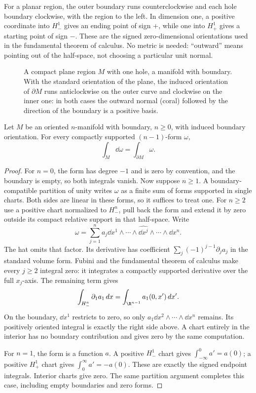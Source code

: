 For a planar region, the outer boundary runs counterclockwise and each hole boundary clockwise, with the region to the left. In dimension one, a positive coordinate into $H_-^1$ gives an ending point of sign $+$, while one into $H_+^1$ gives a starting point of sign $-$. These are the signed zero-dimensional orientations used in the fundamental theorem of calculus. No metric is needed: ``outward'' means pointing out of the half-space, not choosing a particular unit normal.

\begin{figure}[ht]
\centering
{}
\caption{A compact plane region $M$ with one hole, a manifold with boundary. With the standard orientation of the plane, the induced orientation of
$\partial M$ runs anticlockwise on the outer curve and clockwise on the inner one: in both cases the outward normal (coral) followed by the direction of the
boundary is a positive basis.}
\label{fig:boundary}
\end{figure}

\begin{theorem}[Stokes]\label{thm:stokes}
Let $M$ be an oriented $n$-manifold with boundary, $n\ge0$, with induced boundary orientation. For every compactly supported $(n-1)$-form $\omega$,
\[
\int_M\dd\omega=\int_{\partial M}\omega.
\]
\end{theorem}

\begin{proof}
For $n=0$, the form has degree $-1$ and is zero by convention, and the boundary is empty, so both integrals vanish. Now suppose $n\ge1$. A boundary-compatible partition of unity writes $\omega$ as a finite sum of forms supported in single charts. Both sides are linear in these forms, so it suffices to treat one. For $n\ge2$ use a positive chart normalized to $H_-^n$, pull back the form and extend it by zero outside its compact relative support in that half-space. Write
\[
\omega=\sum_{j=1}^n a_j\dd x^1\wedge\cdots\wedge\widehat{\dd x^j}\wedge\cdots\wedge\dd x^n.
\]
The hat omits that factor. Its derivative has coefficient $\sum_j(-1)^{j-1}\partial_ja_j$ in the standard volume form. Fubini and the fundamental theorem of calculus make every $j\ge2$ integral zero: it integrates a compactly supported derivative over the full $x_j$-axis. The remaining term gives
\[
\int_{H_-^n}\partial_1a_1\,dx
=\int_{\R^{n-1}}a_1(0,x')\,dx'.
\]
On the boundary, $\dd x^1$ restricts to zero, so only $a_1\dd x^2\wedge\cdots\wedge\dd x^n$ remains. Its positively oriented integral is exactly the right side above. A chart entirely in the interior has no boundary contribution and gives zero by the same computation.

For $n=1$, the form is a function $a$. A positive $H_-^1$ chart gives $\int_{-\infty}^0a'=a(0)$; a positive $H_+^1$ chart gives $\int_0^\infty a'=-a(0)$. These are exactly the signed endpoint integrals. Interior charts give zero. The same partition argument completes this case, including empty boundaries and zero forms.
\end{proof}


